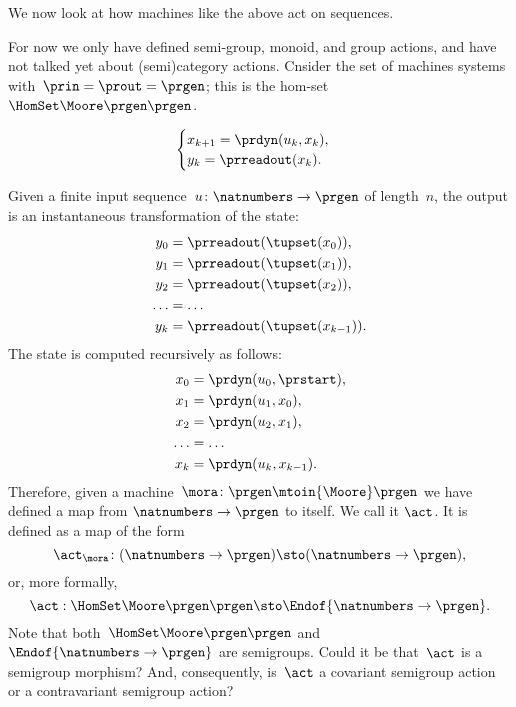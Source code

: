 We now look at how machines like the above act on sequences.

For now we only have defined semi-group, monoid, and group actions, and have not talked yet about (semi)category actions.
Cnsider the set of machines systems with~$\prin = \prout = \prgen$; this is the hom-set~$\HomSet\Moore\prgen\prgen$.

\begin{equation}
    \begin{cases}
        x_{k+1} = \prdyn(u_k, x_k), \\
        y_{k}   = \prreadout(x_{k}).
    \end{cases}
\end{equation}

Given a finite input sequence~$u\colon \natnumbers \to \prgen$ of length~$n$, the output is an instantaneous transformation of the state:
%
\begin{equation}
    \label{eq:actions-on-sequences-y}
    \begin{aligned}
        y_0   & = \prreadout(\tupset(x_0)), \\
        y_1   & = \prreadout(\tupset(x_1)), \\
        y_2   & = \prreadout(\tupset(x_2)), \\
        \dots & = \dots \\
        y_{k} & = \prreadout(\tupset(x_{k-1})).
    \end{aligned}
\end{equation}
%
The state is computed recursively as follows:
\begin{equation}
    \label{eq:actions-on-sequences-x}
    \begin{aligned}
        x_0   & = \prdyn(u_0, \prstart), \\
        x_1   & = \prdyn(u_1, x_0), \\
        x_2   & = \prdyn(u_2, x_1), \\
        \dots & = \dots \\
        x_{k} & = \prdyn(u_{k}, x_{k-1}).
    \end{aligned}
\end{equation}
%
Therefore, given a machine~$\mora \colon \prgen \mtoin{\Moore} \prgen$ we have defined a map from $\natnumbers \to \prgen$ to itself.
We call it $\act$.
It is defined as a map of the form
%
\begin{equation}
    \label{eq:actions-on-sequences-1}
    \act_{\mora}\colon  (\natnumbers \to \prgen)  \sto  (\natnumbers \to \prgen),
\end{equation}
%
or, more formally,
%
\begin{equation}
    \label{eq:actions-on-sequences-2}
    \act: \HomSet\Moore\prgen\prgen \sto \Endof {\natnumbers \to \prgen}.
\end{equation}
%
Note that both~$\HomSet\Moore\prgen\prgen$ and $\Endof {\natnumbers \to \prgen}$ are semigroups.
Could it be that~$\act$ is a semigroup morphism?
And, consequently, is~$\act$ a covariant semigroup action or a contravariant semigroup action?

